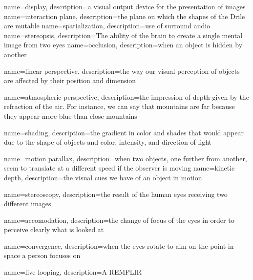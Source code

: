 {
  name=display,
  description={a visual output device for the presentation of images \cite{pimenta2012comprehensive}}
}
{
	name={interaction plane},
	description={the plane on which the shapes of the Drile are mutable}
}
{
	name={spatialization},
	description={use of surround audio}
}
{
name=stereopsis,
description={The ability of the brain to create a single mental image from two eyes}
}
{
	name=occlusion,
	description={when an object is hidden by another}
}

{
	name={linear perspective},
	description={the way our visual perception of objects are affected by their position and dimension}
}

{
	name={atmospheric perspective},
	description={the impression of depth given by the refraction of the air. For instance, we can say that mountains are far because they appear more blue than close mountains}
}	

{
	name=shading,
	description={the gradient in color and shades that would appear due to the shape of objects and color, intensity, and direction of light}
}

{
	name={motion parallax},
	description={when two objects, one further from another, seem to translate at a different speed if the observer is moving}
}
{
	name={kinetic depth},
	description={the visual cues we have of an object in motion}
}

{
	name=stereoscopy,
	description={the result of the human eyes receiving two different images}
}

{
	name=accomodation,
	description={the change of focus of the eyes in order to perceive clearly what is looked at}
}

{
	name=convergence,
	description={when the eyes rotate to aim on the point in space a person focuses on}
}


{
	name={live looping},
	description={A REMPLIR}
}